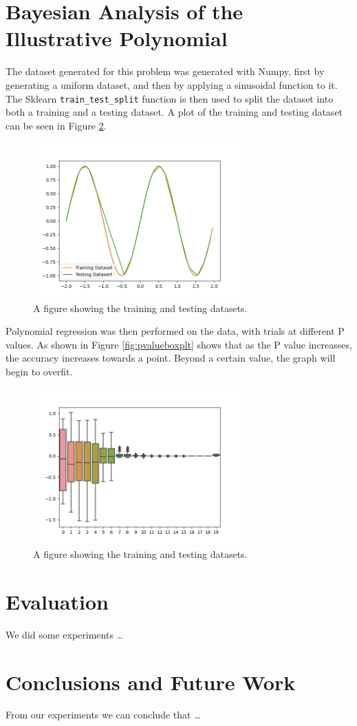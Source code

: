 \documentclass[a4paper, 11pt]{article}
\begin{document}
    
\pagebreak

\section{Bayesian Analysis of the Illustrative Polynomial}

The dataset generated for this problem was generated with Numpy, first by generating a uniform dataset, and then by applying a sinusoidal function to it. The Sklearn \verb|train_test_split| function is then used to split the dataset into both a training and a testing dataset. A plot of the training and testing dataset can be seen in Figure \ref{fig:traintestsplit}.

\begin{figure}[h]
    \includegraphics[width=8cm]{fig/traintestsplit.png}
    \caption{A figure showing the training and testing datasets.}
    \label{fig:traintestsplit}
\end{figure}

Polynomial regression was then performed on the data, with trials at different P values. As shown in Figure \ref{fig:pvalueboxplt} shows that as the P value increasses, the accuracy increases towards a point. Beyond a certain value, the graph will begin to overfit.

\begin{figure}[h]
    \includegraphics[width=8cm]{fig/pvalueboxplot.png}
    \caption{A figure showing the training and testing datasets.}
    \label{fig:traintestsplit}
\end{figure}

\pagebreak

\section{Evaluation}

We did some experiments \ldots

\pagebreak

\section{Conclusions and Future Work}

From our experiments we can conclude that \ldots


\end{document}
